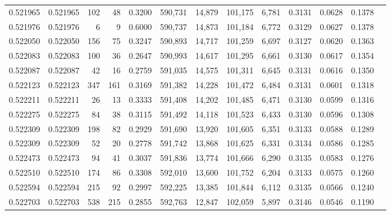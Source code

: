 \begin{tabular}{rrrrrrrrrrrrr}
0.521965 & 0.521965 &   102 &    48 &                                     0.3200 & 590,731 &  14,879 & 101,175 &   6,781 & 0.3131 & 0.0628 & 0.1378 \\
0.521976 & 0.521976 &     6 &     9 &                                     0.6000 & 590,737 &  14,873 & 101,184 &   6,772 & 0.3129 & 0.0627 & 0.1378 \\
0.522050 & 0.522050 &   156 &    75 &                                     0.3247 & 590,893 &  14,717 & 101,259 &   6,697 & 0.3127 & 0.0620 & 0.1363 \\
0.522083 & 0.522083 &   100 &    36 &                                     0.2647 & 590,993 &  14,617 & 101,295 &   6,661 & 0.3130 & 0.0617 & 0.1354 \\
0.522087 & 0.522087 &    42 &    16 &                                     0.2759 & 591,035 &  14,575 & 101,311 &   6,645 & 0.3131 & 0.0616 & 0.1350 \\
0.522123 & 0.522123 &   347 &   161 &                                     0.3169 & 591,382 &  14,228 & 101,472 &   6,484 & 0.3131 & 0.0601 & 0.1318 \\
0.522211 & 0.522211 &    26 &    13 &                                     0.3333 & 591,408 &  14,202 & 101,485 &   6,471 & 0.3130 & 0.0599 & 0.1316 \\
0.522275 & 0.522275 &    84 &    38 &                                     0.3115 & 591,492 &  14,118 & 101,523 &   6,433 & 0.3130 & 0.0596 & 0.1308 \\
0.522309 & 0.522309 &   198 &    82 &                                     0.2929 & 591,690 &  13,920 & 101,605 &   6,351 & 0.3133 & 0.0588 & 0.1289 \\
0.522309 & 0.522309 &    52 &    20 &                                     0.2778 & 591,742 &  13,868 & 101,625 &   6,331 & 0.3134 & 0.0586 & 0.1285 \\
0.522473 & 0.522473 &    94 &    41 &                                     0.3037 & 591,836 &  13,774 & 101,666 &   6,290 & 0.3135 & 0.0583 & 0.1276 \\
0.522510 & 0.522510 &   174 &    86 &                                     0.3308 & 592,010 &  13,600 & 101,752 &   6,204 & 0.3133 & 0.0575 & 0.1260 \\
0.522594 & 0.522594 &   215 &    92 &                                     0.2997 & 592,225 &  13,385 & 101,844 &   6,112 & 0.3135 & 0.0566 & 0.1240 \\
0.522703 & 0.522703 &   538 &   215 &                                     0.2855 & 592,763 &  12,847 & 102,059 &   5,897 & 0.3146 & 0.0546 & 0.1190 \\

\end{tabular}
